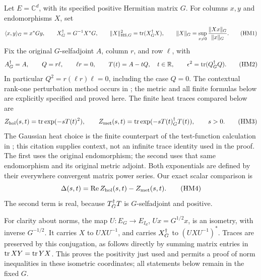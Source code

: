 \documentclass[11pt]{article}
\begin{document}
Let \(E=\mathbb C^d\), with its specified positive Hermitian matrix \(G\).
For columns \(x,y\) and endomorphisms \(X\), set
\begin{equation}
 \langle x,y\rangle_G=x^*Gy,\qquad
 X^\dagger_G=G^{-1}X^*G,\qquad
 \|X\|_{\mathrm{HS},G}^2=\operatorname{tr}(X^\dagger_G X),\qquad
 \|X\|_G=\sup_{x\ne0}\frac{\|Xx\|_G}{\|x\|_G}.
 \tag{HM1}\label{nhm:HM1}
\end{equation}
Fix the original \(G\)-selfadjoint \(A\), column \(r\), and row \(\ell\), with
\begin{equation}
 A^\dagger_G=A,\qquad Q=r\ell,\qquad \ell r=0,\qquad
 T(t)=A-tQ,\quad t\in\mathbb R,\qquad
 \epsilon^2=\operatorname{tr}(Q^\dagger_G Q).
 \tag{HM2}\label{nhm:HM2}
\end{equation}
In particular \(Q^2=r(\ell r)\ell=0\), including the case \(Q=0\).
The contextual rank-one perturbation method occurs in
\cite[original-source Section \texttt{sect:sa}]{nhm:ConnesSuijlekom};
the metric and all finite formulas below are explicitly specified and proved here.
The finite heat traces compared below are
\begin{equation}
 Z_{\mathrm{hol}}(s,t)=\operatorname{tr}\exp(-sT(t)^2),\qquad
 Z_{\mathrm{met}}(s,t)=\operatorname{tr}\exp(-sT(t)^\dagger_G T(t)),\qquad s>0.
 \tag{HM3}\label{nhm:HM3}
\end{equation}
The Gaussian heat choice is the finite counterpart of the test-function
calculation in \cite[original-source formula \texttt{ft}]{nhm:ConnesHeat};
this citation supplies context, not an infinite trace identity used in the proof.
The first uses the original endomorphism; the second uses that same
endomorphism and its original metric adjoint. Both exponentials are defined
by their everywhere convergent matrix power series. Our exact scalar comparison is
\begin{equation}
 \Delta(s,t)=\operatorname{Re} Z_{\mathrm{hol}}(s,t)-Z_{\mathrm{met}}(s,t).
 \tag{HM4}\label{nhm:HM4}
\end{equation}
The second term is real, because \(T^\dagger_G T\) is \(G\)-selfadjoint and positive.

For clarity about norms, the map \(U:E_G\longrightarrow E_{I_d}\),
\(Ux=G^{1/2}x\), is an isometry, with inverse \(G^{-1/2}\).
It carries \(X\) to \(UXU^{-1}\), and carries \(X^\dagger_G\) to
\((UXU^{-1})^*\). Traces are preserved by this conjugation, as follows
directly by summing matrix entries in \(\operatorname{tr} XY=\operatorname{tr} YX\).
This proves the positivity just used and permits a proof of norm inequalities
in these isometric coordinates; all statements below remain in the fixed \(G\).
\end{document}
